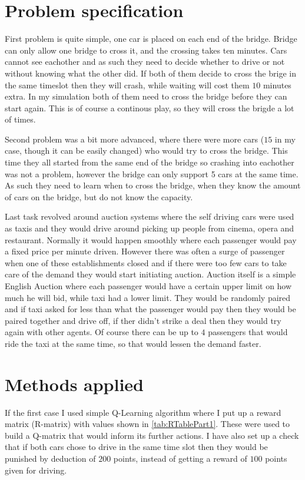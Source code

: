 \documentclass[conference]{IEEEtran}
\begin{document}
\section{Problem specification}
First problem is quite simple, one car is placed on each end of the bridge. Bridge can only allow one bridge to cross it, and the crossing takes ten minutes. Cars cannot see eachother and as such they need to decide whether to drive or not without knowing what the other did. If both of them decide to cross the brige in the same timeslot then they will crash, while waiting will cost them $10$ minutes extra. In my simulation both of them need to cross the bridge before they can start again. This is of course a continous play, so they will cross the brigde a lot of times.

Second problem was a bit more advanced, where there were more cars ($15$ in my case, though it can be easily changed) who would try to cross the bridge. This time they all started from the same end of the bridge so crashing into eachother was not a problem, however the bridge can only support 5 cars at the same time. As such they need to learn when to cross the bridge, when they know the amount of cars on the bridge, but do not know the capacity.

Last task revolved around auction systems where the self driving cars were used as taxis and they would drive around picking up people from cinema, opera and restaurant. Normally it would happen smoothly where each passenger would pay a fixed price per minute driven. However there was often a surge of passenger when one of these establishments closed and if there were too few cars to take care of the demand they would start initiating auction. Auction itself is a simple English Auction where each passenger would have a certain upper limit on how much he will bid, while taxi had a lower limit. They would be randomly paired and if taxi asked for less than what the passenger would pay then they would be paired together and drive off, if ther didn't strike a deal then they would try again with other agents. Of course there can be up to $4$ passengers that would ride the taxi at the same time, so that would lessen the demand faster.

\section{Methods applied}
If the first case I used simple Q-Learning algorithm where I put up a reward matrix (R-matrix) with values shown in \cref{tab:RTablePart1}. These were used to build a Q-matrix that would inform its further actions. I have also set up a check that if both cars chose to drive in the same time slot then they would be punished by deduction of $200$ points, instead of getting a reward of $100$ points given for driving.
\end{document}
